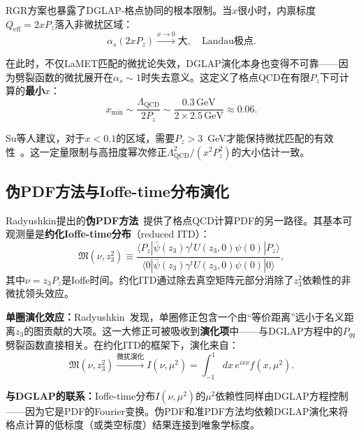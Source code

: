 \documentclass[12pt,a4paper]{ctexart}
\theoremstyle{definition}
\begin{document}
RGR方案也暴露了DGLAP-格点协同的根本限制。当$x$很小时，内禀标度$Q_{\text{eff}} = 2xP_z$落入非微扰区域：
\begin{equation}
\alpha_s(2xP_z) \xrightarrow{x\to 0} \text{大}, \quad \text{Landau极点}.
\label{eq:small_x_breakdown}
\end{equation}

在此时，不仅LaMET匹配的微扰论失效，DGLAP演化本身也变得不可靠——因为劈裂函数的微扰展开在$\alpha_s \sim 1$时失去意义。这定义了格点QCD在有限$P_z$下可计算的\textbf{最小$x$}：
\begin{equation}
x_{\min} \sim \frac{\Lambda_{\text{QCD}}}{2P_z} \sim \frac{0.3\,\text{GeV}}{2 \times 2.5\,\text{GeV}} \approx 0.06.
\label{eq:xmin}
\end{equation}

Su等人建议，对于$x < 0.1$的区域，需要$P_z > 3$~GeV才能保持微扰匹配的有效性~\cite{Su2023RGR}。这一定量限制与高扭度幂次修正$\Lambda_{\text{QCD}}^2/(x^2 P_z^2)$的大小估计一致。

\subsection{伪PDF方法与Ioffe-time分布演化}

Radyushkin提出的\textbf{伪PDF方法}~\cite{Radyushkin2018oneLoop}提供了格点QCD计算PDF的另一路径。其基本可观测量是\textbf{约化Ioffe-time分布}（reduced ITD）：
\begin{equation}
\mathfrak{M}(\nu, z_3^2) \equiv \frac{\langle P_z | \bar\psi(z_3)\gamma^t U(z_3,0)\psi(0) | P_z \rangle}{\langle 0 | \bar\psi(z_3)\gamma^t U(z_3,0)\psi(0) | 0 \rangle},
\label{eq:reduced_ITD}
\end{equation}
其中$\nu = z_3 P_z$是Ioffe时间。约化ITD通过除去真空矩阵元部分消除了$z_3^2$依赖性的非微扰领头效应。

\textbf{单圈演化效应：}Radyushkin~\cite{Radyushkin2018oneLoop}发现，单圈修正包含一个由``等价距离''远小于名义距离$z_3$的图贡献的大项。这一大修正可被吸收到\textbf{演化项}中——与DGLAP方程中的$P_{qq}$劈裂函数直接相关。在约化ITD的框架下，演化来自：
\begin{equation}
\mathfrak{M}(\nu, z_3^2) \xrightarrow{\text{微扰演化}} I(\nu, \mu^2) = \int_{-1}^1 dx\, e^{i x \nu} f(x, \mu^2).
\label{eq:ITD_evolution}
\end{equation}

\textbf{与DGLAP的联系：}Ioffe-time分布$I(\nu, \mu^2)$的$\mu^2$依赖性同样由DGLAP方程控制——因为它是PDF的Fourier变换。伪PDF和准PDF方法均依赖DGLAP演化来将格点计算的低标度（或类空标度）结果连接到唯象学标度。
\end{document}
